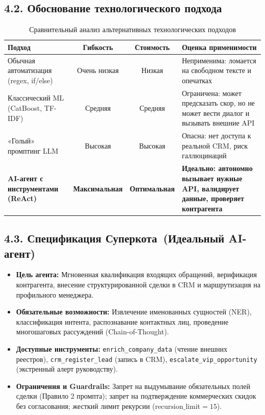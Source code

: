 \documentclass[12pt,a4paper]{article}
\begin{document}
	\subsection*{4.2. Обоснование технологического подхода}
	\begin{table}[H]
		\centering
		\small
		\caption{Сравнительный анализ альтернативных технологических подходов}
		\begin{tabularx}{\textwidth}{|X|c|c|X|}
			\hline
			\textbf{Подход} & \textbf{Гибкость} & \textbf{Стоимость} & \textbf{Оценка применимости} \\
			\hline
			Обычная автоматизация (regex, if/else) & Очень низкая & Низкая & Неприменима: ломается на свободном тексте и опечатках \\
			\hline
			Классический ML (CatBoost, TF-IDF) & Средняя & Средняя & Ограничена: может предсказать скор, но не может вести диалог и вызывать внешние API \\
			\hline
			«Голый» промптинг LLM & Высокая & Высокая & Опасна: нет доступа к реальной CRM, риск галлюцинаций \\
			\hline
			\textbf{AI-агент с инструментами (ReAct)} & \textbf{Максимальная} & \textbf{Оптимальная} & \textbf{Идеально: автономно вызывает нужные API, валидирует данные, проверяет контрагента} \\
			\hline
		\end{tabularx}
	\end{table}

	\subsection*{4.3. Спецификация \guillemotleft Суперкота\guillemotright\ (Идеальный AI-агент)}
	\begin{itemize}[noitemsep,topsep=2pt]
		\item \textbf{Цель агента:} Мгновенная квалификация входящих обращений, верификация контрагента, внесение структурированной сделки в CRM и маршрутизация на профильного менеджера.
		\item \textbf{Обязательные возможности:} Извлечение именованных сущностей (NER), классификация интента, распознавание контактных лиц, проведение многошаговых рассуждений (Chain-of-Thought).
		\item \textbf{Доступные инструменты:} \texttt{enrich\_company\_data} (чтение внешних реестров), \texttt{crm\_register\_lead} (запись в CRM), \texttt{escalate\_vip\_opportunity} (экстренный алерт руководству).
		\item \textbf{Ограничения и Guardrails:} Запрет на выдумывание обязательных полей сделки (Правило 2 промпта); запрет на подтверждение коммерческих скидок без согласования; жесткий лимит рекурсии ($\text{recursion\_limit} = 15$).
	\end{itemize}
\end{document}
